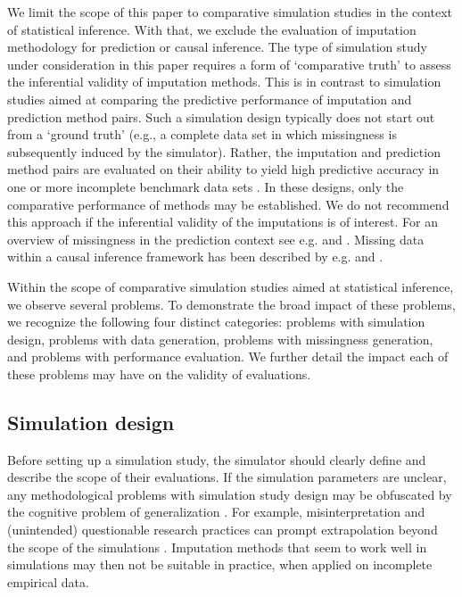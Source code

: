 \documentclass[bimj,fleqn]{w-art}
\begin{document}
We limit the scope of this paper to comparative simulation studies in the context of statistical inference. With that, we exclude the evaluation of imputation methodology for prediction or causal inference. The type of simulation study under consideration in this paper requires a form of `comparative truth' to assess the inferential validity of imputation methods. This is in contrast to simulation studies aimed at comparing the predictive performance of imputation and prediction method pairs. Such a simulation design typically does not start out from a `ground truth' (e.g., a complete data set in which missingness is subsequently induced by the simulator). Rather, the imputation and prediction method pairs are evaluated on their ability to yield high predictive accuracy in one or more incomplete benchmark data sets \citep{liu21}. In these designs, only the comparative performance of methods may be established. We do not recommend this approach if the inferential validity of the imputations is of interest. For an overview of missingness in the prediction context see e.g. \citet{wood15} and \citet{sper20}. Missing data within a causal inference framework has been described by e.g. \cite{more18} and \cite{moha21}.

Within the scope of comparative simulation studies aimed at statistical inference, we observe several problems. To demonstrate the broad impact of these problems, we recognize the following four distinct categories: problems with simulation design, problems with data generation, problems with missingness generation, and problems with performance evaluation. We further detail the impact each of these problems may have on the validity of evaluations. 



\subsection{Simulation design}

Before setting up a simulation study, the simulator should clearly define and describe the scope of their evaluations. If the simulation parameters are unclear, any methodological problems with simulation study design may be obfuscated by the cognitive problem of generalization \citep{gree17}. For example, misinterpretation and (unintended) questionable research practices can prompt extrapolation beyond the scope of the simulations \citep{gree17, pawe22}. Imputation methods that seem to work well in simulations may then not be suitable in practice, when applied on incomplete empirical data.
\end{document}
